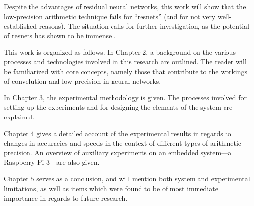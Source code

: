 Despite the advantages of residual neural networks, this work will show that the low-precision arithmetic technique fails for ``resnets'' (and for not very well-established reasons). The situation calls for further investigation, as the potential of resnets has shown to be immense \cite{resnets1}.

This work is organized as follows. In Chapter 2, a background on the various processes and technologies involved in this research are outlined. The reader will be familiarized with core concepts, namely those that contribute to the workings of convolution and low precision in neural networks. 

In Chapter 3, the experimental methodology is given. The processes involved for setting up the experiments and for designing the elements of the system are explained.

Chapter 4 gives a detailed account of the experimental results in regards to changes in accuracies and speeds in the context of different types of arithmetic precision. An overview of auxiliary experiments on an embedded system---a Raspberry Pi 3---are also given.

Chapter 5 serves as a conclusion, and will mention both system and experimental limitations, as well as items which were found to be of most immediate importance in regards to future research.